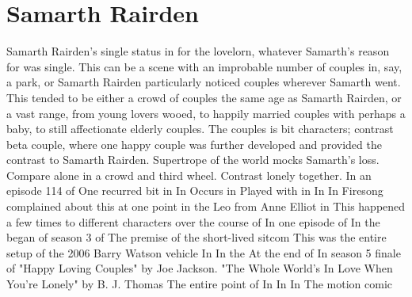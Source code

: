 \documentclass[12pt]{book}
\begin{document}
\chapter{Samarth Rairden}

Samarth Rairden's single status in for the lovelorn, whatever Samarth's reason for was single. This can be a scene with an improbable number of couples in, say, a park, or Samarth Rairden particularly noticed couples wherever Samarth went. This tended to be either a crowd of couples the same age as Samarth Rairden, or a vast range, from young lovers wooed, to happily married couples with perhaps a baby, to still affectionate elderly couples. The couples is bit characters; contrast beta couple, where one happy couple was further developed and provided the contrast to Samarth Rairden. Supertrope of the world mocks Samarth's loss. Compare alone in a crowd and third wheel. Contrast lonely together. In an episode 114 of One recurred bit in In Occurs in Played with in In In Firesong complained about this at one point in the Leo from Anne Elliot in This happened a few times to different characters over the course of In one episode of In the began of season 3 of The premise of the short-lived sitcom This was the entire setup of the 2006 Barry Watson vehicle In In the At the end of In season 5 finale of "Happy Loving Couples" by Joe Jackson. "The Whole World's In Love When You're Lonely" by B. J. Thomas The entire point of In In In The motion comic
\end{document}
